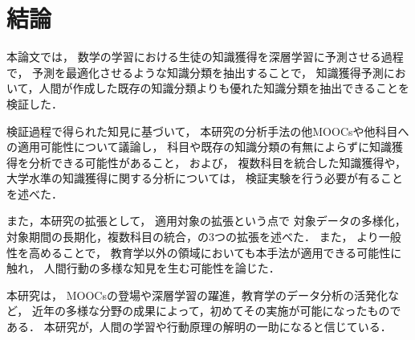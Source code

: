 \chapter{結論}
\label{chap:conlusion}
\fancyhf{}
\rhead{\thepage}
\cfoot{\thepage}


本論文では，
数学の学習における生徒の知識獲得を深層学習に予測させる過程で，
予測を最適化させるような知識分類を抽出することで，
知識獲得予測において，人間が作成した既存の知識分類よりも優れた知識分類を抽出できることを検証した．
\vvspace



検証過程で得られた知見に基づいて，
本研究の分析手法の他MOOCsや他科目への適用可能性について議論し，
科目や既存の知識分類の有無によらずに知識獲得を分析できる可能性があること，
および，
複数科目を統合した知識獲得や，大学水準の知識獲得に関する分析については，
検証実験を行う必要が有ることを述べた．
\vvspace


また，本研究の拡張として，
適用対象の拡張という点で
対象データの多様化，対象期間の長期化，複数科目の統合，の3つの拡張を述べた．
また，
より一般性を高めることで，
教育学以外の領域においても本手法が適用できる可能性に触れ，
人間行動の多様な知見を生む可能性を論じた．
\vvspace


本研究は，
MOOCsの登場や深層学習の躍進，教育学のデータ分析の活発化など，
近年の多様な分野の成果によって，初めてその実施が可能になったものである．
本研究が，人間の学習や行動原理の解明の一助になると信じている．



